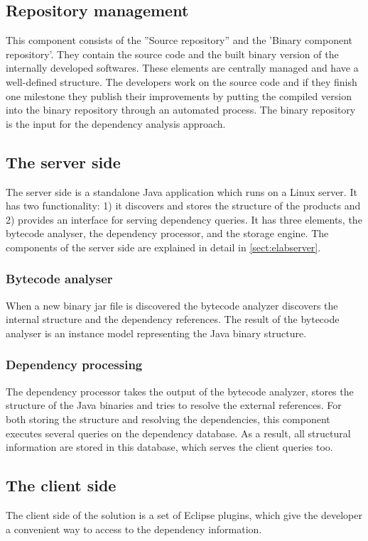 \subsection{Repository management}
This component consists of the ''Source repository'' and the 'Binary component
repository'. They contain the source code and the built binary version of
the internally developed softwares. These elements are centrally managed and
have a well-defined structure. The developers work on the source code and if
they finish one milestone they publish their improvements by putting the
compiled version into the binary repository through an automated process.
The binary repository is the input for the dependency analysis approach.

\subsection{The server side}
The server side is a standalone Java application which runs on a Linux server.
It has two functionality: 1) it discovers and stores the structure of the
products and 2) provides an interface for serving dependency queries. It has three
elements, the bytecode analyser, the dependency processor, and the storage engine.
The components of the server side are explained in detail in \autoref{sect:elabserver}.

\subsubsection{Bytecode analyser}
When a new binary jar file is discovered the bytecode analyzer  discovers the
internal structure and the dependency references. The result of the bytecode
analyser is an instance model representing the Java binary structure.

\subsubsection{Dependency processing}
The dependency processor takes the output of the bytecode analyzer, stores the 
structure of the Java binaries and tries to resolve the external references.
For both storing the structure and resolving the dependencies, this component
executes several queries on the dependency database. As a result, all structural
information are stored in this database, which serves the client queries too.


\subsection{The client side}
The client side of the solution is a set of  Eclipse plugins, which give the
developer a convenient way to access to the dependency information. 

